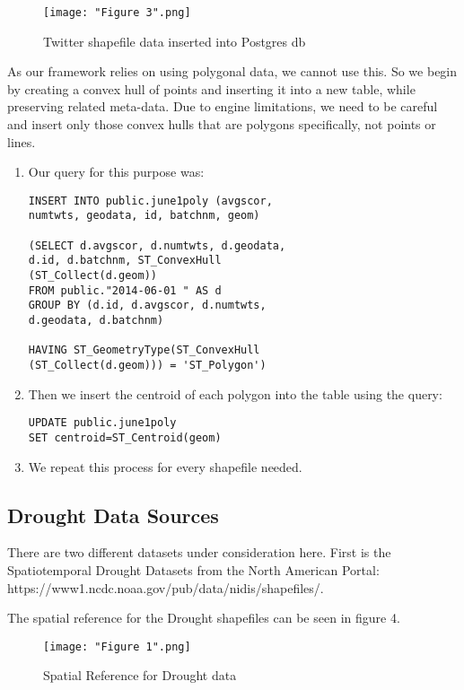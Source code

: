 \documentclass[conference]{IEEEtran}
\begin{document}
\begin{figure}[ht]
\centerline{\texttt{[image: "Figure 3".png]}}
\caption{Twitter shapefile data inserted into Postgres db}
\label{Figure 3}
\end{figure}

As our framework relies on using polygonal data, we cannot use this. So we begin by creating a convex hull of points and inserting it into a new table, while preserving related meta-data. Due to engine limitations, we need to be careful and insert only those convex hulls that are polygons specifically, not points or lines.

\begin{enumerate}
	\item Our query for this purpose was:
\begin{lstlisting}
INSERT INTO public.june1poly (avgscor, 
numtwts, geodata, id, batchnm, geom)

(SELECT d.avgscor, d.numtwts, d.geodata, 
d.id, d.batchnm, ST_ConvexHull
(ST_Collect(d.geom))
FROM public."2014-06-01 " AS d
GROUP BY (d.id, d.avgscor, d.numtwts,
d.geodata, d.batchnm)

HAVING ST_GeometryType(ST_ConvexHull
(ST_Collect(d.geom))) = 'ST_Polygon')
\end{lstlisting}
	\item Then we insert the centroid of each polygon into the table using the query:

\begin{lstlisting}
UPDATE public.june1poly 
SET centroid=ST_Centroid(geom)
\end{lstlisting}

	\item We repeat this process for every shapefile needed.
\end{enumerate}

\subsection{Drought Data Sources}

There are two different datasets under consideration here. First is the Spatiotemporal Drought Datasets from the North American Portal: https://www1.ncdc.noaa.gov/pub/data/nidis/shapefiles/.



The spatial reference for the Drought shapefiles can be seen in figure 4.  

\begin{figure}[ht]
\centerline{\texttt{[image: "Figure 1".png]}}
\caption{Spatial Reference for Drought data}
\label{Figure 4}
\end{figure}
\end{document}
